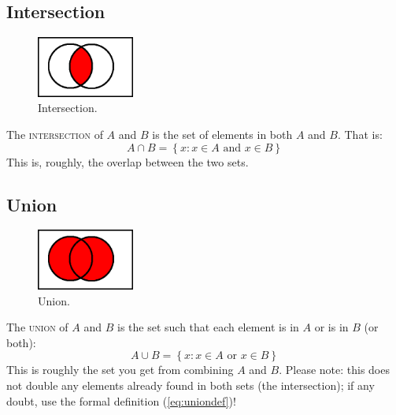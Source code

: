 \documentclass[a4paper,12pt,oneside,leqno]{scrartcl}%
\theoremstyle{definition}
\newcommand{\terminus}[1]{\textsc{#1}}
\begin{document}
\subsection{Intersection}
\begin{figure}
\includegraphics[height=2cm]{set-base-lettered-intersection}
\vspace{-20pt}
\caption{Intersection.}\label{fig:sets-intersection}
\vspace{-20pt}
\end{figure}
The \terminus{intersection} of $A$ and $B$ is the set of elements in both $A$ and $B$. That is:
\begin{equation}
A \cap B = \left\{x: x \in A \text{ and } x \in B \right\}
\end{equation}
This is, roughly, the overlap between the two sets.

\subsection{Union}
\begin{figure}
\includegraphics[height=2cm]{set-base-lettered-union}
\vspace{-20pt}
\caption{Union.}\label{fig:sets-union}
\vspace{-20pt}
\end{figure}
The \terminus{union} of $A$ and $B$ is the set such that each element is in $A$ or is in $B$ (or both):  
\begin{equation}\label{eq:uniondef}
A \cup B = \left\{x: x \in A \text{ or } x \in B \right\}
\end{equation}
This is roughly the set you get from combining $A$ and $B$.  Please note: this does not double any elements already found in both sets (the intersection); if any doubt, use the formal definition (\ref{eq:uniondef})!
\pagebreak
\end{document}
